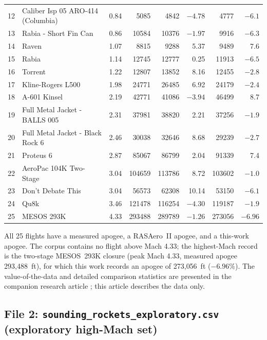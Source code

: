 \begin{longtable}{@{}r >{\raggedright\arraybackslash}p{} r r r r r r@{}}
12 & Caliber Isp 05 ARO-414 (Columbia)   & 0.84 & 5085   & 4842   & $-4.78$ & 4777 & $-6.1$ \\
13 & Rabia - Short Fin Can               & 0.86 & 10584  & 10376  & $-1.97$ & 9916 & $-6.3$ \\
14 & Raven                               & 1.07 & 8815   & 9288   & 5.37  & 9489   & 7.6  \\
15 & Rabia                               & 1.14 & 12745  & 12777  & 0.25  & 11913  & $-6.5$ \\
16 & Torrent                             & 1.22 & 12807  & 13852  & 8.16  & 12455  & $-2.8$ \\
17 & Kline-Rogers L500                   & 1.98 & 24771  & 26485  & 6.92  & 24179  & $-2.4$ \\
18 & A-601 Kinsel                        & 2.19 & 42771  & 41086  & $-3.94$ & 46499 & 8.7 \\
19 & Full Metal Jacket - BALLS 005       & 2.31 & 37981  & 38820  & 2.21  & 37256  & $-1.9$ \\
20 & Full Metal Jacket - Black Rock 6    & 2.46 & 30038  & 32646  & 8.68  & 29239  & $-2.7$ \\
21 & Proteus 6                           & 2.87 & 85067  & 86799  & 2.04  & 91339  & 7.4  \\
22 & AeroPac 104K Two-Stage              & 3.04 & 104659 & 113786 & 8.72  & 103602 & $-1.0$ \\
23 & Don't Debate This                   & 3.04 & 56573  & 62308  & 10.14 & 53150  & $-6.1$ \\
24 & Qu8k                                & 3.46 & 121478 & 116254 & $-4.30$ & 119187 & $-1.9$ \\
25 & MESOS 293K                          & 4.33 & 293488 & 289789 & $-1.26$ & 273056 & $-6.96$ \\
\end{longtable}
\endgroup

All 25 flights have a measured apogee, a RASAero~II apogee, and a this-work
apogee. The corpus contains no flight above Mach 4.33; the highest-Mach record
is the two-stage MESOS~293K closure (peak Mach 4.33, measured apogee
293{,}488~ft), for which this work records an apogee of 273{,}056~ft
($-6.96\%$). The value-of-the-data and detailed comparison statistics are
presented in the companion research article \cite{yu2026jsr}; this article
describes the data only.

\subsection{File 2: \texttt{sounding\_rockets\_exploratory.csv} (exploratory
high-Mach set)}

